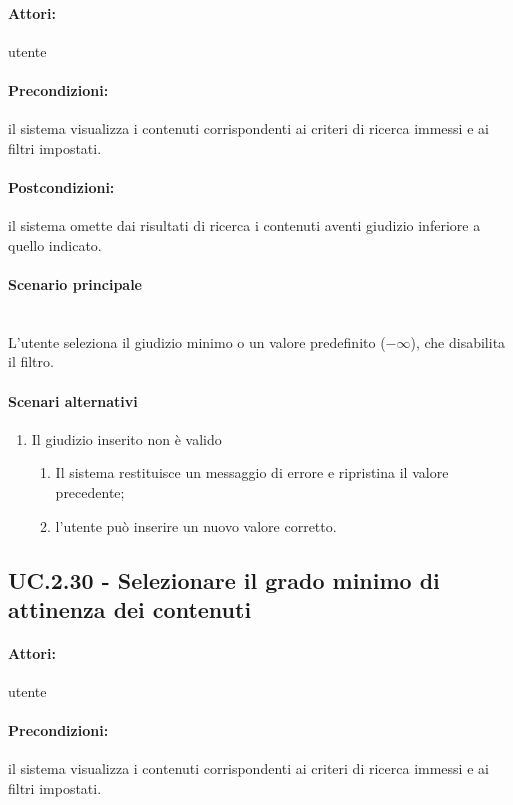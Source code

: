 \documentclass[10pt,a4paper,headinclude,footinclude,hidelinks]{scrreprt} %
\begin{document}
	\paragraph{Attori:} utente
	\paragraph{Precondizioni:} il sistema visualizza i contenuti corrispondenti ai criteri di ricerca immessi e ai filtri impostati.
	\paragraph{Postcondizioni:} il sistema omette dai risultati di ricerca i contenuti aventi giudizio inferiore a quello indicato.
	\paragraph{Scenario principale} \hfill \\
	L'utente seleziona il giudizio minimo o un valore predefinito ($-\infty$), che disabilita il filtro.
	\paragraph{Scenari alternativi}
	\begin{enumerate}
	\item Il giudizio inserito non è valido
		\begin{enumerate}
		\item Il sistema restituisce un messaggio di errore e ripristina il valore precedente;
		\item l'utente può inserire un nuovo valore corretto.
		\end{enumerate}
	\end{enumerate}

	\subsection[UC.2.30]{UC.2.30 - Selezionare il grado minimo di attinenza dei contenuti}
	\label{sec:stage:ar:uc:2_30}
	\paragraph{Attori:} utente
	\paragraph{Precondizioni:} il sistema visualizza i contenuti corrispondenti ai criteri di ricerca immessi e ai filtri impostati.
\end{document}

